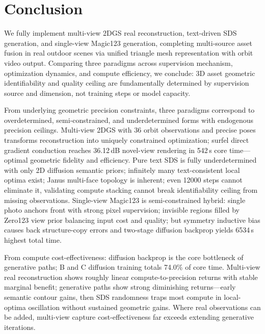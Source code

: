 \documentclass[10pt,twocolumn,letterpaper]{article}
\begin{document}
\section{Conclusion}
\label{sec:t1-conclusion}

We fully implement multi-view 2DGS real reconstruction, text-driven SDS generation, and single-view Magic123 generation, completing multi-source asset fusion in real outdoor scenes via unified triangle mesh representation with orbit video output. Comparing three paradigms across supervision mechanism, optimization dynamics, and compute efficiency, we conclude: 3D asset geometric identifiability and quality ceiling are fundamentally determined by supervision source and dimension, not training steps or model capacity.

From underlying geometric precision constraints, three paradigms correspond to overdetermined, semi-constrained, and underdetermined forms with endogenous precision ceilings. Multi-view 2DGS with 36 orbit observations and precise poses transforms reconstruction into uniquely constrained optimization; surfel direct gradient conduction reaches 36.12\,dB novel-view rendering in 542\,s core time---optimal geometric fidelity and efficiency. Pure text SDS is fully underdetermined with only 2D diffusion semantic priors; infinitely many text-consistent local optima exist; Janus multi-face topology is inherent; even 12000 steps cannot eliminate it, validating compute stacking cannot break identifiability ceiling from missing observations. Single-view Magic123 is semi-constrained hybrid: single photo anchors front with strong pixel supervision; invisible regions filled by Zero123 view prior balancing input cost and quality; but symmetry inductive bias causes back structure-copy errors and two-stage diffusion backprop yields 6534\,s highest total time.

From compute cost-effectiveness: diffusion backprop is the core bottleneck of generative paths; B and C diffusion training totals 74.0\% of core time. Multi-view real reconstruction shows roughly linear compute-to-precision returns with stable marginal benefit; generative paths show strong diminishing returns---early semantic contour gains, then SDS randomness traps most compute in local-optima oscillation without sustained geometric gains. Where real observations can be added, multi-view capture cost-effectiveness far exceeds extending generative iterations.
\end{document}
